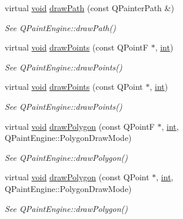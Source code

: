 \begin{DoxyCompactItemize}
virtual \hyperlink{group___u_a_v_objects_plugin_ga444cf2ff3f0ecbe028adce838d373f5c}{void} \hyperlink{class_qwt_null_paint_device_a1df889689ff1e29a0f864be5ac809ada}{draw\-Path} (const Q\-Painter\-Path \&)
\begin{DoxyCompactList}\small\item\em See Q\-Paint\-Engine\-::draw\-Path() \end{DoxyCompactList}\item 
virtual \hyperlink{group___u_a_v_objects_plugin_ga444cf2ff3f0ecbe028adce838d373f5c}{void} \hyperlink{class_qwt_null_paint_device_a5b0b40aed4fa6b4b193834cf89af2a3e}{draw\-Points} (const Q\-Point\-F $\ast$, \hyperlink{ioapi_8h_a787fa3cf048117ba7123753c1e74fcd6}{int})
\begin{DoxyCompactList}\small\item\em See Q\-Paint\-Engine\-::draw\-Points() \end{DoxyCompactList}\item 
virtual \hyperlink{group___u_a_v_objects_plugin_ga444cf2ff3f0ecbe028adce838d373f5c}{void} \hyperlink{class_qwt_null_paint_device_a89f89b7398be0e9c3c24cdf7e37803e2}{draw\-Points} (const Q\-Point $\ast$, \hyperlink{ioapi_8h_a787fa3cf048117ba7123753c1e74fcd6}{int})
\begin{DoxyCompactList}\small\item\em See Q\-Paint\-Engine\-::draw\-Points() \end{DoxyCompactList}\item 
virtual \hyperlink{group___u_a_v_objects_plugin_ga444cf2ff3f0ecbe028adce838d373f5c}{void} \hyperlink{class_qwt_null_paint_device_ad8ccc7d13b3ed6011c4f986210912d02}{draw\-Polygon} (const Q\-Point\-F $\ast$, \hyperlink{ioapi_8h_a787fa3cf048117ba7123753c1e74fcd6}{int}, Q\-Paint\-Engine\-::\-Polygon\-Draw\-Mode)
\begin{DoxyCompactList}\small\item\em See Q\-Paint\-Engine\-::draw\-Polygon() \end{DoxyCompactList}\item 
virtual \hyperlink{group___u_a_v_objects_plugin_ga444cf2ff3f0ecbe028adce838d373f5c}{void} \hyperlink{class_qwt_null_paint_device_a9bd92d6203a0c7ad70a529d59d685eb1}{draw\-Polygon} (const Q\-Point $\ast$, \hyperlink{ioapi_8h_a787fa3cf048117ba7123753c1e74fcd6}{int}, Q\-Paint\-Engine\-::\-Polygon\-Draw\-Mode)
\begin{DoxyCompactList}\small\item\em See Q\-Paint\-Engine\-::draw\-Polygon() \end{DoxyCompactList}\item 

\end{DoxyCompactItemize}
